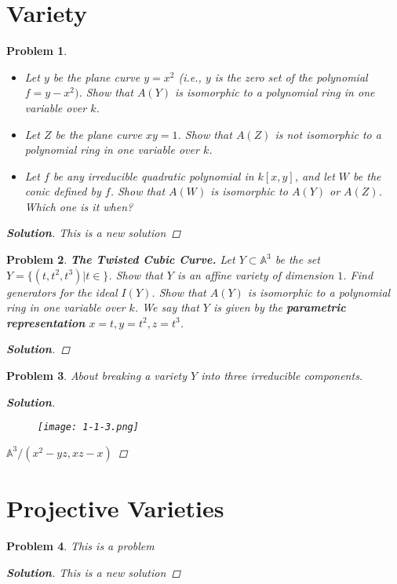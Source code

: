 \documentclass[11pt]{article}
\newtheorem{problem}{Problem}
\numberwithin{problem}{section}
\newenvironment{solution}
               {\let\oldqedsymbol=\qedsymbol
                \renewcommand{\qedsymbol}{$\blacktriangleleft$}
                \begin{proof}[\bfseries\upshape Solution]}
               {\end{proof}
                \renewcommand{\qedsymbol}{\oldqedsymbol}}
\begin{document}
\section{Variety}

\begin{problem}
\begin{itemize}
\item[(a)] Let $y$ be the plane curve $y = x^2$ (i.e., $y$ is the zero set of the polynomial $f = y - x^2)$. Show that $A(Y)$ is isomorphic to a polynomial ring in one variable over $k$.
\item[(b)] Let $Z$ be the plane curve $xy=1$. Show that $A(Z)$ is not isomorphic to a polynomial ring in one variable over $k$.
\item[(c)*] Let $f$ be any irreducible quadratic polynomial in $k[x,y]$, and let $W$ be the conic defined by $f$. Show that $A(W)$ is isomorphic to $A(Y)$ or $A(Z)$. Which one is it when?
\end{itemize}
\begin{solution}
This is a new solution	
\end{solution}	
\end{problem}

\begin{problem}
\textbf{The Twisted Cubic Curve.} Let $Y\subset \mathbb{A}^3$ be the set $Y=\{(t,t^2,t^3)|t\in\}$. Show that $Y$ is an affine variety of dimension $1$. Find generators for the ideal $I(Y)$. Show that $A(Y)$ is isomorphic to a polynomial ring in one variable over $k$. We say that $Y$ is given by the \textbf{parametric representation} $x=t, y=t^2, z=t^3$.
\begin{solution}


\end{solution}
\end{problem}

\begin{problem}
About breaking a variety $Y$ into three irreducible components.
\begin{solution}
\begin{figure}[!h]
\texttt{[image: 1-1-3.png]}
\end{figure}


$\mathbb{A}^3/(x^2-yz, xz-x)$
\end{solution}
\end{problem}

\section{Projective Varieties}

\begin{problem}
This is a problem
\begin{solution}
This is a new solution	
\end{solution}	
\end{problem}
\end{document}
